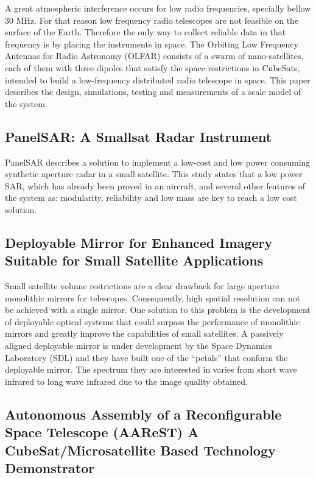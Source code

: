 A great atmospheric interference occurs for low radio frequencies,
specially bellow 30 MHz. For that reason low frequency radio telescopes
are not feasible on the surface of the Earth. Therefore the only way
to collect reliable data in that frequency is by placing the instruments
in space. The Orbiting Low Frequency Antennas for Radio Astronomy
(OLFAR) consists of a swarm of nano-satellites, each of them with
three dipoles that satisfy the space restrictions in CubeSats, intended
to build a low-frequency distributed radio telescope in space. This
paper describes the design, simulations, testing and measurements
of a scale model of the system. \cite{Quillen_FF_RadioTelescope}

\subsection{PanelSAR: A Smallsat Radar Instrument}

PanelSAR describes a solution to implement a low-cost and low power consuming synthetic aperture radar in a small satellite. This study states that a low power SAR, which has already been proved in an aircraft, and several other features of the system as: modularity, reliability and low mass are key to reach a low cost solution.\cite{Dujin_Radar}

\subsection{Deployable Mirror for Enhanced Imagery Suitable for Small Satellite Applications}

Small satellite volume restrictions are a clear drawback for large
aperture monolithic mirrors for telescopes. Consequently, high spatial
resolution can not be achieved with a single mirror. One solution
to this problem is the development of deployable optical systems that
could surpass the performance of monolithic mirrors and greatly improve
the capabilities of small satellites. A passively aligned deployable
mirror is under development by the Space Dynamics Laboratory (SDL) and
they have built one of the ``petals'' that conform the deployable
mirror. The spectrum they are interested in varies from short wave
infrared to long wave infrared due to the image quality obtained.\cite{Champagne_deployablemirror}

\subsection{Autonomous Assembly of a Reconfigurable Space Telescope (AAReST) \textendash{} A CubeSat/Microsatellite Based Technology Demonstrator}


